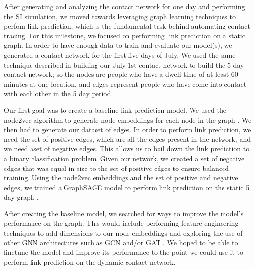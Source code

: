 \documentclass[times, 10pt,twocolumn]{article}
\begin{document}
After generating and analyzing the contact network for one day and performing the SI simulation, we moved towards leveraging graph learning techniques to perfom link prediction, which is the fundamental task behind automating contact tracing. For this milestone, we focused on performing link prediction on a static graph. In order to have enough data to train and evaluate our model(s), we generated a contact network for the first five days of July. We used the same technique described in building our July 1st contact network to build the 5 day contact network; so the nodes are people who have a dwell time of at least 60 minutes at one location, and edges represent people who have come into contact with each other in the 5 day period. 

Our first goal was to create a baseline link prediction model. We used the node2vec algorithm to generate node embeddings for each node in the graph \cite{grover2016node2vec}. We then had to generate our dataset of edges. In order to perform link prediction, we need the set of positive edges, which are all the edges present in the network, and we need aset of negative edges. This allows us to boil down the link prediction to a binary classification problem. Given our network, we created a set of negative edges that was equal in size to the set of positive edges to ensure balanced training. Using the node2vec embeddings and the set of positive and negative edges, we trained a GraphSAGE model to perform link prediction on the static 5 day graph \cite{hamilton2018inductive}.

After creating the baseline model, we searched for ways to improve the model's performance on the graph. This would include performing feature engineering techniques to add dimensions to our node embeddings and exploring the use of other GNN architectures such as GCN and/or GAT \cite{kipf2017semisupervised}\cite{veličković2018graph}. We hoped to be able to finetune the model and improve its performance to the point we could use it to perform link prediction on the dynamic contact network. 

\end{document}

